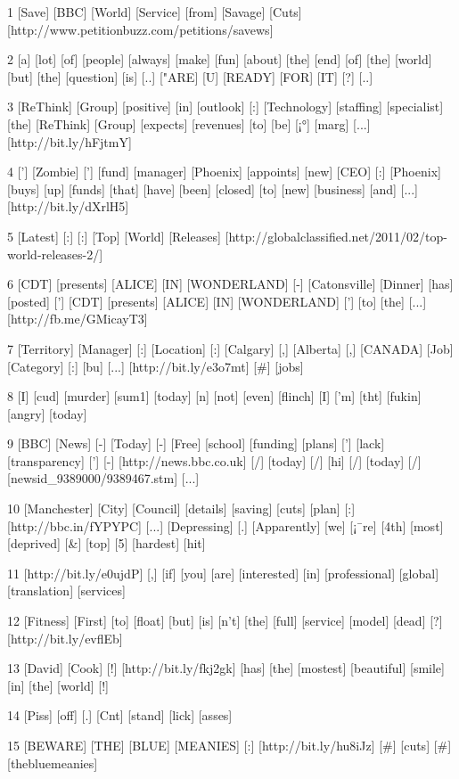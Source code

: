 \documentclass[a4paper, 11pt]{article}
\begin{document}
\begin{spverbatim}
1 [Save] [BBC] [World] [Service] [from] [Savage] [Cuts] 
[http://www.petitionbuzz.com/petitions/savews] 

2 [a] [lot] [of] [people] [always] [make] [fun] [about] [the] [end] [of] [the] [world] [but] [the] [question] [is] [..] ["ARE] [U] [READY] [FOR] [IT] [?] [..] 

3 [ReThink] [Group] [positive] [in] [outlook] [:] [Technology] [staffing] [specialist] [the] [ReThink] [Group] [expects] [revenues] [to] [be] [¡°] [marg] [...] 
[http://bit.ly/hFjtmY] 

4 ['] [Zombie] ['] [fund] [manager] [Phoenix] [appoints] [new] [CEO] [:] [Phoenix] [buys] [up] [funds] [that] [have] [been] [closed] [to] [new] [business] [and] [...] [http://bit.ly/dXrlH5] 

5 [Latest] [:] [:] [Top] [World] [Releases] 
[http://globalclassified.net/2011/02/top-world-releases-2/] 

6 [CDT] [presents] [ALICE] [IN] [WONDERLAND] [-] [Catonsville] [Dinner] [has] [posted] ['] [CDT] [presents] [ALICE] [IN] [WONDERLAND] ['] [to] [the] [...] 
[http://fb.me/GMicayT3] 

7 [Territory] [Manager] [:] [Location] [:] [Calgary] [,] [Alberta] [,] [CANADA] [Job] [Category] [:] [bu] [...] [http://bit.ly/e3o7mt] [#] [jobs] 

8 [I] [cud] [murder] [sum1] [today] [n] [not] [even] [flinch] [I] ['m] [tht] [fukin] [angry] [today] 

9 [BBC] [News] [-] [Today] [-] [Free] [school] [funding] [plans] ['] [lack] [transparency] ['] [-] [http://news.bbc.co.uk] [/] [today] [/] [hi] [/] [today] [/] 
[newsid_9389000/9389467.stm] [...]

10 [Manchester] [City] [Council] [details] [saving] [cuts] [plan] [:] 
[http://bbc.in/fYPYPC] [...] [Depressing] [.] [Apparently] [we] [¡¯re] [4th] [most] [deprived] [&] [top] [5] [hardest] [hit] 

11 [http://bit.ly/e0ujdP] [,] [if] [you] [are] [interested] [in] [professional] [global] [translation] [services] 

12 [Fitness] [First] [to] [float] [but] [is] [n't] [the] [full] [service] [model] [dead] [?] [http://bit.ly/evflEb] 

13 [David] [Cook] [!] [http://bit.ly/fkj2gk] [has] [the] [mostest] [beautiful] [smile] [in] [the] [world] [!] 

14 [Piss] [off] [.] [Cnt] [stand] [lick] [asses] 

15 [BEWARE] [THE] [BLUE] [MEANIES] [:] 
[http://bit.ly/hu8iJz] [#] [cuts] [#] [thebluemeanies] 


\end{spverbatim}
\end{document}
